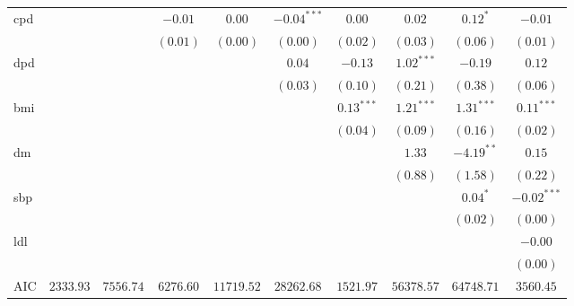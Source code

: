 \begin{tabular}{l c c c c c c c c c}
cpd              &               &               & $-0.01$       & $0.00$        & $-0.04^{***}$ & $0.00$         & $0.02$        & $0.12^{*}$    & $-0.01$        \\
                 &               &               & $(0.01)$      & $(0.00)$      & $(0.00)$      & $(0.02)$       & $(0.03)$      & $(0.06)$      & $(0.01)$       \\
dpd              &               &               &               &               & $0.04$        & $-0.13$        & $1.02^{***}$  & $-0.19$       & $0.12$         \\
                 &               &               &               &               & $(0.03)$      & $(0.10)$       & $(0.21)$      & $(0.38)$      & $(0.06)$       \\
bmi              &               &               &               &               &               & $0.13^{***}$   & $1.21^{***}$  & $1.31^{***}$  & $0.11^{***}$   \\
                 &               &               &               &               &               & $(0.04)$       & $(0.09)$      & $(0.16)$      & $(0.02)$       \\
dm               &               &               &               &               &               &                & $1.33$        & $-4.19^{**}$  & $0.15$         \\
                 &               &               &               &               &               &                & $(0.88)$      & $(1.58)$      & $(0.22)$       \\
sbp              &               &               &               &               &               &                &               & $0.04^{*}$    & $-0.02^{***}$  \\
                 &               &               &               &               &               &                &               & $(0.02)$      & $(0.00)$       \\
ldl              &               &               &               &               &               &                &               &               & $-0.00$        \\
                 &               &               &               &               &               &                &               &               & $(0.00)$       \\
\midrule
AIC              & $2333.93$     & $7556.74$     & $6276.60$     & $11719.52$    & $28262.68$    & $1521.97$      & $56378.57$    & $64748.71$    & $3560.45$      \\

\end{tabular}
